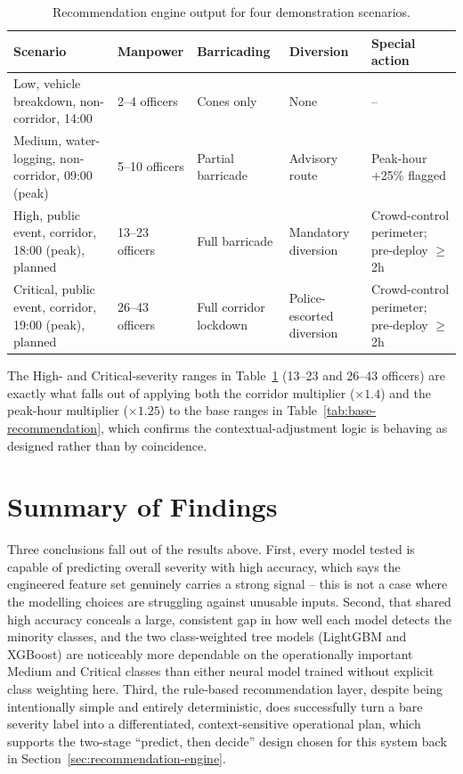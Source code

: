 \begin{table}[!h]
\centering
\caption{Recommendation engine output for four demonstration scenarios.}
\label{tab:recommendation-demo}
\small
\begin{tabular}{p{3.3cm}p{1.6cm}p{2.6cm}p{2.6cm}p{2.9cm}}
\toprule
Scenario & Manpower & Barricading & Diversion & Special action \\
\midrule
Low, vehicle breakdown, non-corridor, 14:00 & 2--4 officers & Cones only & None & -- \\
\addlinespace
Medium, water-logging, non-corridor, 09:00 (peak) & 5--10 officers & Partial barricade & Advisory route & Peak-hour +25\% flagged \\
\addlinespace
High, public event, corridor, 18:00 (peak), planned & 13--23 officers & Full barricade & Mandatory diversion & Crowd-control perimeter; pre-deploy $\geq$2h \\
\addlinespace
Critical, public event, corridor, 19:00 (peak), planned & 26--43 officers & Full corridor lockdown & Police-escorted diversion & Crowd-control perimeter; pre-deploy $\geq$2h \\
\bottomrule
\end{tabular}
\end{table}

The High- and Critical-severity ranges in Table~\ref{tab:recommendation-demo} (13--23 and 26--43 officers) are exactly what falls out of applying both the corridor multiplier ($\times 1.4$) and the peak-hour multiplier ($\times 1.25$) to the base ranges in Table~\ref{tab:base-recommendation}, which confirms the contextual-adjustment logic is behaving as designed rather than by coincidence.

\section{Summary of Findings}

Three conclusions fall out of the results above. First, every model tested is capable of predicting overall severity with high accuracy, which says the engineered feature set genuinely carries a strong signal -- this is not a case where the modelling choices are struggling against unusable inputs. Second, that shared high accuracy conceals a large, consistent gap in how well each model detects the minority classes, and the two class-weighted tree models (LightGBM and XGBoost) are noticeably more dependable on the operationally important Medium and Critical classes than either neural model trained without explicit class weighting here. Third, the rule-based recommendation layer, despite being intentionally simple and entirely deterministic, does successfully turn a bare severity label into a differentiated, context-sensitive operational plan, which supports the two-stage ``predict, then decide'' design chosen for this system back in Section~\ref{sec:recommendation-engine}.

